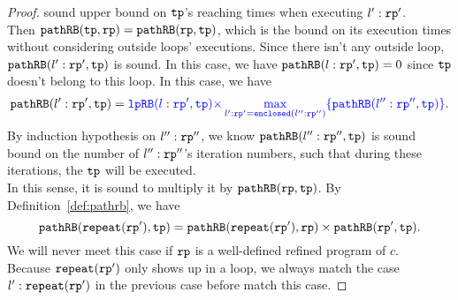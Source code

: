 \begin{proof}
sound upper bound on $\mathtt{tp}$'s reaching times when executing $l': \mathtt{rp}'$.
%
\\
Then $\mathtt{pathRB}(\mathtt{tp}, \mathtt{rp}) = \mathtt{pathRB}(\mathtt{rp}, \mathtt{tp})$, which is the bound on its execution times without considering
outside loops' executions. 
Since there isn't any outside loop, $\mathtt{pathRB}(l': \mathtt{rp}', \mathtt{tp})$ is sound.
In this case, we have $\mathtt{pathRB}(l: \mathtt{rp}', \mathtt{tp}) = 0$ since $\mathtt{tp}$ doesn't belong to this loop.
%
In this case, we have 
\[
  \inoutB(l': \rprog', \tpath) = \highlight{ \lpchB(l:\rprog', \tpath) }
\highlight{\times \max\limits_{l':\rprog' = \kw{enclosed}(l'':\rprog'')} \{\inoutB(l'':\rprog'', \tpath)\} }.
\]
By induction hypothesis on $l'':\mathtt{rp}''$, we know  $\mathtt{pathRB}(l'':\mathtt{rp}'', \mathtt{tp})$ is sound bound on the number of $l'':\mathtt{rp}''$'s iteration numbers, such that during these iterations, the $\mathtt{tp}$ will be executed.
\\
In this sense, it is sound to multiply it by $\mathtt{pathRB}(\mathtt{rp}, \mathtt{tp})$.
%
By Definition~\ref{def:pathrb}, we have
\[
  \mathtt{pathRB}(\mathtt{repeat}(\mathtt{rp}'), \mathtt{tp}) = \mathtt{pathRB}(\mathtt{repeat}(\mathtt{rp}'), \mathtt{rp}) \times \mathtt{pathRB}(\mathtt{rp}', \mathtt{tp}).
\]
We will never meet this case if $\mathtt{rp}$ is a well-defined refined program of $c$.
\\
Because $\mathtt{repeat}(\mathtt{rp}')$ only shows up in a loop, we always match the case $l' : \mathtt{repeat}(\mathtt{rp}')$ in the previous case before match this case.
%
\end{proof}



